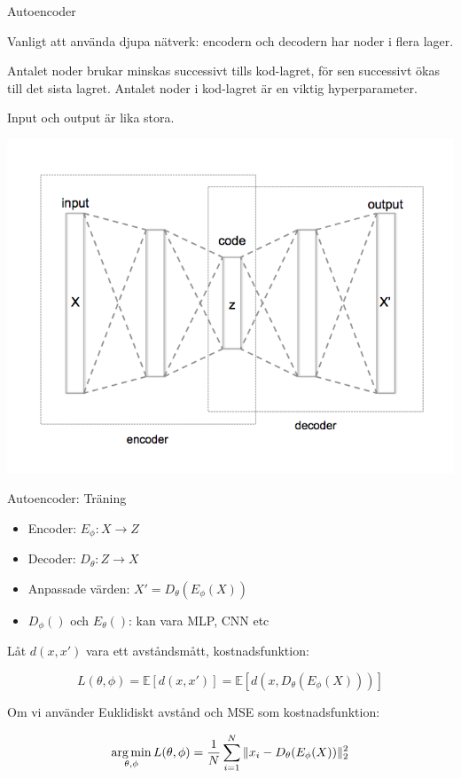 \documentclass[10pt,english]{beamer}
\begin{document}
\begin{frame}{Autoencoder}
    
    Vanligt att använda djupa nätverk: encodern och decodern har noder i flera lager.
    
    Antalet noder brukar minskas successivt tills kod-lagret, för sen successivt ökas till det sista lagret. Antalet noder i kod-lagret är en viktig hyperparameter.
    
    Input och output är lika stora.
    
    \includegraphics[scale=0.30]{figs/Autoencoder_structure_deep.png}
    

\end{frame}


\begin{frame}{Autoencoder: Träning}
    
    \begin{itemize}
      \item Encoder: $E_\phi: X \rightarrow Z$
      \item Decoder: $D_\theta: Z \rightarrow X$
      \item Anpassade värden: $X' = D_\theta (E_\phi(X))$
      \item $D_\phi()$ och $E_\theta()$: kan vara MLP, CNN etc
    \end{itemize}
        
    Låt $d(x,x')$ vara ett avståndsmått, kostnadsfunktion:
    
    \begin{equation*}
        L(\theta ,\phi) = \mathbb{E}[d(x,x')] = \mathbb{E}[d(x,D_\theta (E_\phi(X)))]
    \end{equation*}
    
    Om vi använder Euklidiskt avstånd och MSE som kostnadsfunktion:
    
    \begin{equation*}
        \operatorname*{arg\,min}_{\theta ,\phi} L(\theta ,\phi) = \frac{1}{N} \sum_{i=1}^{N} \| x_i - D_\theta(E_\phi(X)) \|_{2}^{2}
    \end{equation*}
    
\end{frame}
\end{document}

